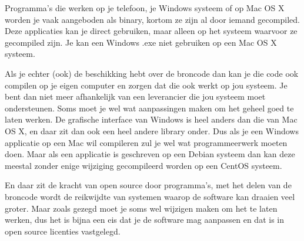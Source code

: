 Programma's die werken op je telefoon, je Windows systeem of op Mac OS X worden je vaak aangeboden als binary, kortom ze zijn al door iemand gecompiled. Deze applicaties kan je direct gebruiken, maar alleen op het systeem waarvoor ze gecompiled zijn. Je kan een Windows .exe niet gebruiken op een Mac OS X systeem.

Als je echter (ook) de beschikking hebt over de broncode dan kan je die code ook compilen op je eigen computer en zorgen dat
die ook werkt op jou systeem. Je bent dan niet meer afhankelijk van een leverancier die jou systeem moet ondersteunen.
Soms moet je wel wat aanpassingen maken om het geheel goed te laten werken. De grafische interface van Windows is heel
anders dan die van Mac OS X, en daar zit dan ook een heel andere library onder. Dus als je een Windows applicatie op
een Mac wil compileren zul je wel wat programmeerwerk moeten doen. Maar als een applicatie is geschreven op een
Debian systeem dan kan deze meestal zonder enige wijziging gecompileerd worden op een CentOS systeem.

En daar zit de kracht van open source door programma's, met het delen van de broncode wordt de reikwijdte van systemen
waarop de software kan draaien veel groter. Maar zoals gezegd moet je soms wel wijzigen maken om het te laten werken,
dus het is bijna een eis dat je de software mag aanpassen en dat is in open source licenties vastgelegd.
